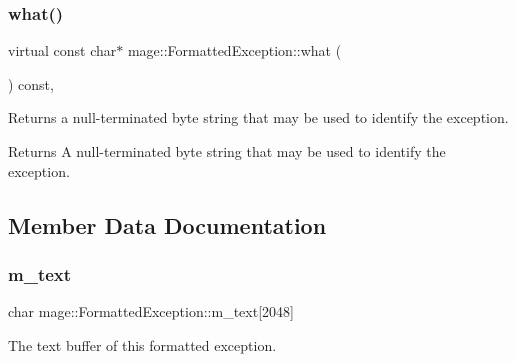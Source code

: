 \subsubsection{\texorpdfstring{what()}{what()}}
{\footnotesize\ttfamily virtual const char$\ast$ mage\+::\+Formatted\+Exception\+::what (\begin{DoxyParamCaption}{ }\end{DoxyParamCaption}) const\hspace{0.3cm}{\ttfamily [override]}, {\ttfamily [virtual]}}

Returns a null-\/terminated byte string that may be used to identify the exception.

\begin{DoxyReturn}{Returns}
A null-\/terminated byte string that may be used to identify the exception. 
\end{DoxyReturn}


\subsection{Member Data Documentation}
\hypertarget{structmage_1_1_formatted_exception_aadccdcc1db09285dadc6b5a30681e05b}{}\label{structmage_1_1_formatted_exception_aadccdcc1db09285dadc6b5a30681e05b} 
\subsubsection{\texorpdfstring{m\+\_\+text}{m\_text}}
{\footnotesize\ttfamily char mage\+::\+Formatted\+Exception\+::m\+\_\+text\mbox{[}2048\mbox{]}\hspace{0.3cm}{\ttfamily [private]}}

The text buffer of this formatted exception. 